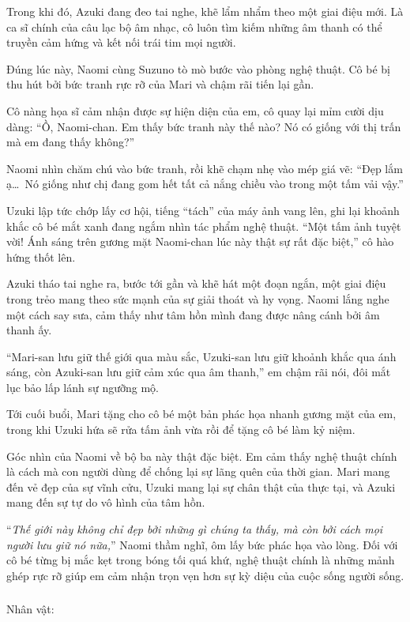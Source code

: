 \documentclass[../main.tex]{subfiles}
\begin{document}
Trong khi đó, Azuki đang đeo tai nghe, khẽ lẩm nhẩm theo một giai điệu mới. Là ca sĩ chính của câu lạc bộ âm nhạc, cô luôn tìm kiếm những âm thanh có thể truyền cảm hứng và kết nối trái tim mọi người.

Đúng lúc này, Naomi cùng Suzuno tò mò bước vào phòng nghệ thuật. Cô bé bị thu hút bởi bức tranh rực rỡ của Mari và chậm rãi tiến lại gần.

Cô nàng họa sĩ cảm nhận được sự hiện diện của em, cô quay lại mỉm cười dịu dàng: ``Ồ, Naomi-chan. Em thấy bức tranh này thế nào? Nó có giống với thị trấn mà em đang thấy không?''

Naomi nhìn chăm chú vào bức tranh, rồi khẽ chạm nhẹ vào mép giá vẽ: ``Đẹp lắm ạ\dots\ Nó giống như chị đang gom hết tất cả nắng chiều vào trong một tấm vải vậy.''

Uzuki lập tức chớp lấy cơ hội, tiếng ``tách'' của máy ảnh vang lên, ghi lại khoảnh khắc cô bé mắt xanh đang ngắm nhìn tác phẩm nghệ thuật. ``Một tấm ảnh tuyệt vời! Ánh sáng trên gương mặt Naomi-chan lúc này thật sự rất đặc biệt,'' cô hào hứng thốt lên.

Azuki tháo tai nghe ra, bước tới gần và khẽ hát một đoạn ngắn, một giai điệu trong trẻo mang theo sức mạnh của sự giải thoát và hy vọng. Naomi lắng nghe một cách say sưa, cảm thấy như tâm hồn mình đang được nâng cánh bởi âm thanh ấy.

``Mari-san lưu giữ thế giới qua màu sắc, Uzuki-san lưu giữ khoảnh khắc qua ánh sáng, còn Azuki-san lưu giữ cảm xúc qua âm thanh,'' em chậm rãi nói, đôi mắt lục bảo lấp lánh sự ngưỡng mộ.

Tới cuối buổi, Mari tặng cho cô bé một bản phác họa nhanh gương mặt của em, trong khi Uzuki hứa sẽ rửa tấm ảnh vừa rồi để tặng cô bé làm kỷ niệm.

Góc nhìn của Naomi về bộ ba này thật đặc biệt. Em cảm thấy nghệ thuật chính là cách mà con người dùng để chống lại sự lãng quên của thời gian. Mari mang đến vẻ đẹp của sự vĩnh cửu, Uzuki mang lại sự chân thật của thực tại, và Azuki mang đến sự tự do vô hình của tâm hồn.

``\textit{Thế giới này không chỉ đẹp bởi những gì chúng ta thấy, mà còn bởi cách mọi người lưu giữ nó nữa,}'' Naomi thầm nghĩ, ôm lấy bức phác họa vào lòng. Đối với cô bé từng bị mắc kẹt trong bóng tối quá khứ, nghệ thuật chính là những mảnh ghép rực rỡ giúp em cảm nhận trọn vẹn hơn sự kỳ diệu của cuộc sống người sống.

\newpage

\subsubsection*{\label{ep-ER12}}
\begin{center}{\caviar Nhân vật:  }\end{center}
\end{document}
